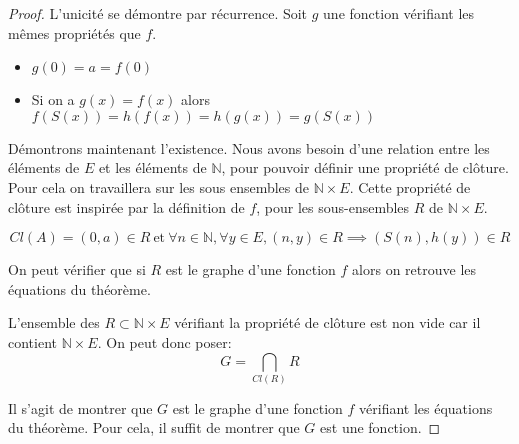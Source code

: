 \begin{proof}
	L'unicité se démontre par récurrence. Soit $g$ une fonction vérifiant les mêmes propriétés que $f$.
	\begin{itemize}
		\item $g(0) = a = f(0)$
		\item Si on a $g(x) = f(x)$ alors $f(S(x)) = h(f(x)) = h(g(x)) = g(S(x))$
	\end{itemize}
	Démontrons maintenant l'existence. Nous avons besoin d'une relation entre les éléments de $E$ et les éléments de $\mathbb{N}$, pour pouvoir
	définir une propriété de clôture. Pour cela on travaillera sur les sous ensembles de $\mathbb{N} \times E$.
	Cette propriété de clôture est inspirée par la définition de $f$, pour les sous-ensembles $R$ de $\mathbb{N} \times E$.

	$$ Cl(A) = (0,a) \in R \ \text{et} \ \forall n \in \mathbb{N}, \forall y \in E, (n,y) \in R \implies (S(n), h(y)) \in R $$

	On peut vérifier que si $R$ est le graphe d'une fonction $f$ alors on retrouve les équations du théorème.

	L'ensemble des $R \subset \mathbb{N} \times E$ vérifiant la propriété de clôture est non vide car il contient $\mathbb{N} \times E$. On peut donc poser:
	$$ G = \bigcap\limits_{Cl(R)} R $$

	Il s'agit de montrer que $G$ est le graphe d'une fonction $f$ vérifiant les équations du théorème. Pour cela, il suffit de montrer que $G$ est une fonction.


\end{proof}

